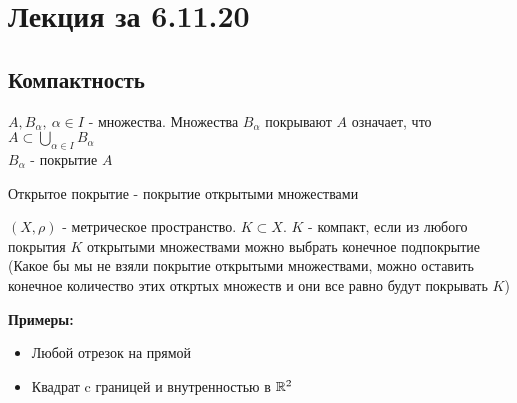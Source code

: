 \section{Лекция за 6.11.20}
\subsection{Компактность}
\begin{conj}
    $A, B_{\alpha}, \ {\alpha \in I}$ - множества. Множества $B_{\alpha}$ покрывают $A$
    означает, что $A \subset \bigcup\limits_{\alpha \in I} B_{\alpha}$ \\
    $B_{\alpha}$ - покрытие $A$
\end{conj}
\begin{conj}
    Открытое покрытие - покрытие открытыми множествами
\end{conj}
\begin{conj}
    $(X, \rho)$ - метрическое пространство. $K \subset X$.
    $K$ - компакт, если из любого покрытия $K$ открытыми множествами можно выбрать конечное подпокрытие 
    (Какое бы мы не взяли покрытие открытыми множествами, можно оставить конечное количество этих откртых множеств
    и они все равно будут покрывать $K$)
\end{conj}
\textbf{Примеры:} 
\begin{itemize}
    \item[] Любой отрезок на прямой
    \item[] Квадрат c границей и внутренностью в $\mathbb{R}^2$
\end{itemize}
